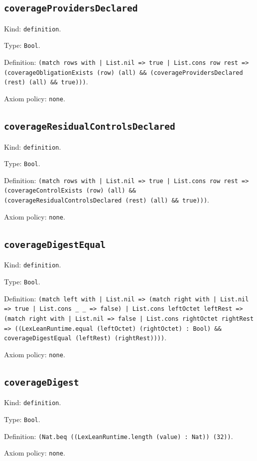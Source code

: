 \documentclass[11pt]{article}
\begin{document}
\subsection*{\texttt{coverageProvidersDeclared}}
\noindent Kind: \texttt{definition}.\par
\noindent Type: \texttt{Bool}.\par
\noindent Definition: \texttt{(match rows with | List.nil => true | List.cons row rest => (coverageObligationExists (row) (all) \&\& (coverageProvidersDeclared (rest) (all) \&\& true)))}.\par
\noindent Axiom policy: \texttt{none}.\par
\subsection*{\texttt{coverageResidualControlsDeclared}}
\noindent Kind: \texttt{definition}.\par
\noindent Type: \texttt{Bool}.\par
\noindent Definition: \texttt{(match rows with | List.nil => true | List.cons row rest => (coverageControlExists (row) (all) \&\& (coverageResidualControlsDeclared (rest) (all) \&\& true)))}.\par
\noindent Axiom policy: \texttt{none}.\par
\subsection*{\texttt{coverageDigestEqual}}
\noindent Kind: \texttt{definition}.\par
\noindent Type: \texttt{Bool}.\par
\noindent Definition: \texttt{(match left with | List.nil => (match right with | List.nil => true | List.cons \_ \_ => false) | List.cons leftOctet leftRest => (match right with | List.nil => false | List.cons rightOctet rightRest => ((LexLeanRuntime.equal (leftOctet) (rightOctet) : Bool) \&\& coverageDigestEqual (leftRest) (rightRest))))}.\par
\noindent Axiom policy: \texttt{none}.\par
\subsection*{\texttt{coverageDigest}}
\noindent Kind: \texttt{definition}.\par
\noindent Type: \texttt{Bool}.\par
\noindent Definition: \texttt{(Nat.beq ((LexLeanRuntime.length (value) : Nat)) (32))}.\par
\noindent Axiom policy: \texttt{none}.\par
\end{document}
